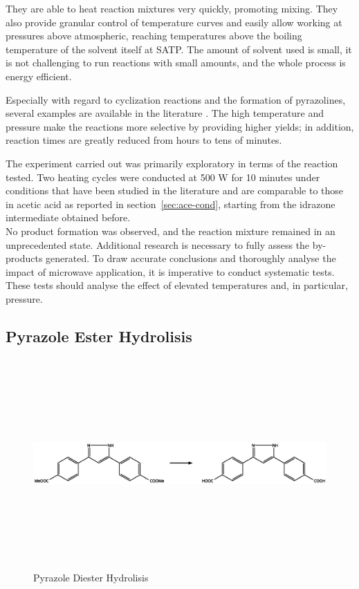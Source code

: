 \documentclass[../Master.tex]{subfiles}
\begin{document}
They are able to heat reaction mixtures very quickly, promoting mixing. They also provide granular control of temperature curves and easily allow working at pressures above atmospheric, reaching temperatures above the boiling temperature of the solvent itself at SATP. The amount of solvent used is small, it is not challenging to run reactions with small amounts, and the whole process is energy efficient.

Especially with regard to cyclization reactions and the formation of pyrazolines, several examples are available in the literature \cite{azarifar_microwave-assisted_2003}. The high temperature and pressure make the reactions more selective by providing higher yields; in addition, reaction times are greatly reduced from hours to tens of minutes.

The experiment carried out was primarily exploratory in terms of the reaction tested. Two heating cycles were conducted at 500 W for 10 minutes under conditions that have been studied in the literature and are comparable to those in acetic acid as reported in section\ \ref{sec:ace-cond}, starting from the idrazone intermediate obtained before.\\
No product formation was observed, and the reaction mixture remained in an unprecedented state. Additional research is necessary to fully assess the by-products generated.
To draw accurate conclusions and thoroughly analyse the impact of microwave application, it is imperative to conduct systematic tests. These tests should analyse the effect of elevated temperatures and, in particular, pressure.

\subsection{Pyrazole Ester Hydrolisis}\label{sec:pyrazole-hydro}

\begin{figure}[h!]
	\centering
	\includegraphics[width=13cm,height=8cm,keepaspectratio]{Structures/pyrazole-hydro.eps}
	\caption{Pyrazole Diester Hydrolisis}\label{fig:pyrazole-form}
\end{figure}
\end{document}
